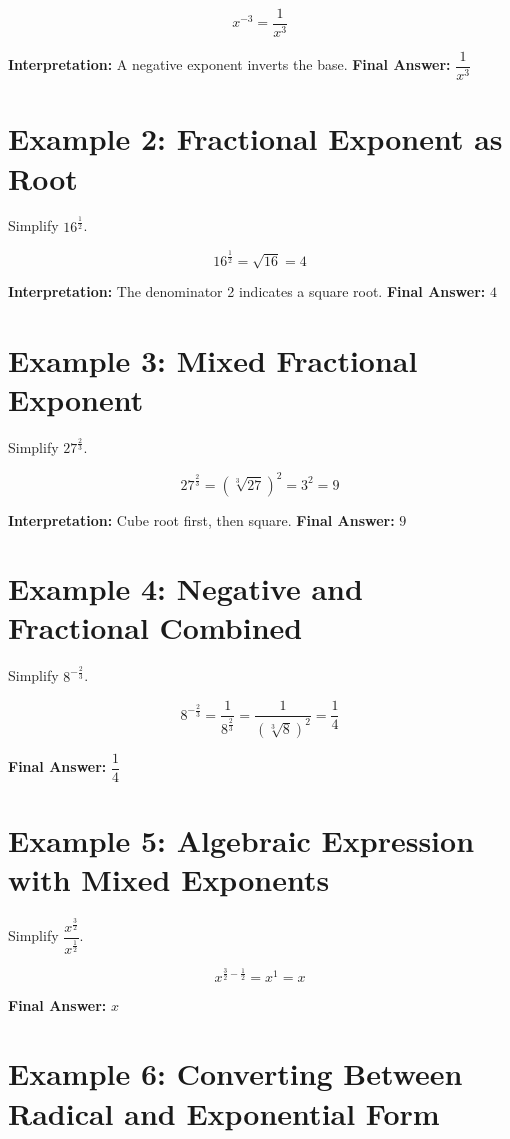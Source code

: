 \documentclass[12pt]{article}
\begin{document}
\[
x^{-3} = \frac{1}{x^3}
\]

\textbf{Interpretation:} A negative exponent inverts the base.  
\textbf{Final Answer:} \(\boxed{\dfrac{1}{x^3}}\)

\section*{Example 2: Fractional Exponent as Root}

Simplify \(16^{\frac{1}{2}}\).

\[
16^{\frac{1}{2}} = \sqrt{16} = 4
\]

\textbf{Interpretation:} The denominator 2 indicates a square root.  
\textbf{Final Answer:} \(\boxed{4}\)

\section*{Example 3: Mixed Fractional Exponent}

Simplify \(27^{\frac{2}{3}}\).

\[
27^{\frac{2}{3}} = (\sqrt[3]{27})^2 = 3^2 = 9
\]

\textbf{Interpretation:} Cube root first, then square.  
\textbf{Final Answer:} \(\boxed{9}\)

\section*{Example 4: Negative and Fractional Combined}

Simplify \(8^{-\frac{2}{3}}\).

\[
8^{-\frac{2}{3}} = \frac{1}{8^{\frac{2}{3}}} = \frac{1}{(\sqrt[3]{8})^2} = \frac{1}{4}
\]

\textbf{Final Answer:} \(\boxed{\dfrac{1}{4}}\)

\section*{Example 5: Algebraic Expression with Mixed Exponents}

Simplify \(\dfrac{x^{\frac{3}{2}}}{x^{\frac{1}{2}}}\).

\[
x^{\frac{3}{2} - \frac{1}{2}} = x^{1} = x
\]

\textbf{Final Answer:} \(\boxed{x}\)

\section*{Example 6: Converting Between Radical and Exponential Form}
\end{document}
